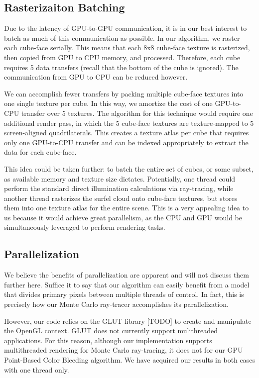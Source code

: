 \subsection{Rasterizaiton Batching}
\label{subsec:raster-batching}
Due to the latency of GPU-to-GPU communication, it is in our best interest to batch as much of this communication as possible. In our algorithm, we raster each cube-face serially. This means that each 8x8 cube-face texture is rasterized, then copied from GPU to CPU memory, and processed. Therefore, each cube requires 5 data transfers (recall that the bottom of the cube is ignored). The communication from GPU to CPU can be reduced however.

We can accomplish fewer transfers by packing multiple cube-face textures into one single texture per cube. In this way, we amortize the cost of one GPU-to-CPU transfer over 5 textures. The algorithm for this technique would require one additional render pass, in which the 5 cube-face textures are texture-mapped to 5 screen-aligned quadrilaterals. This creates a texture atlas per cube that requires only one GPU-to-CPU transfer and can be indexed appropriately to extract the data for each cube-face.

This idea could be taken further: to batch the entire set of cubes, or some subset, as available memory and texture size dictates. Potentially, one thread could perform the standard direct illumination calculations via ray-tracing, while another thread rasterizes the surfel cloud onto cube-face textures, but stores them into one texture atlas for the entire scene. This is a very appealing idea to us because it would achieve great parallelism, as the CPU and GPU would be simultaneously leveraged to perform rendering tasks.

\subsection{Parallelization}
We believe the benefits of parallelization are apparent and will not discuss them further here. Suffice it to say that our algorithm can easily benefit from a model that divides primary pixels between multiple threads of control. In fact, this is precisely how our Monte Carlo ray-tracer accomplishes its parallelization. 

However, our code relies on the GLUT library [TODO] to create and manipulate the OpenGL context. GLUT does not currently support mulithreaded applications. For this reason, although our implementation supports multithreaded rendering for Monte Carlo ray-tracing, it does not for our GPU Point-Based Color Bleeding algorithm. We have acquired our results in both cases with one thread only.
 
